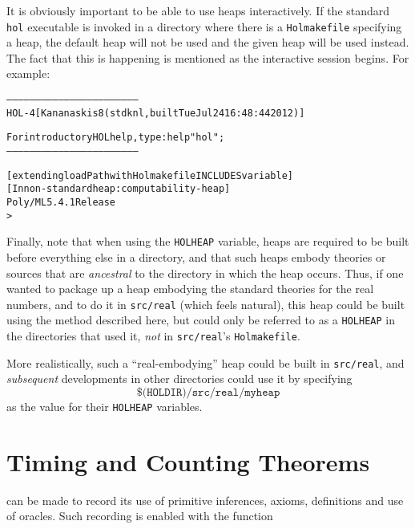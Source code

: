 It is obviously important to be able to use heaps interactively.
If the standard \texttt{hol} executable is invoked in a directory where there is a \texttt{Holmakefile} specifying a heap, the default heap will not be used and the given heap will be used instead.
The fact that this is happening is mentioned as the interactive session begins.
For example:
\begin{samepage}
\begin{alltt}
---------------------------------------------------------------------
       HOL-4 [Kananaskis 8 (stdknl, built Tue Jul 24 16:48:44 2012)]

       For introductory HOL help, type: help "hol";
---------------------------------------------------------------------

[extending loadPath with Holmakefile INCLUDES variable]
[In non-standard heap: computability-heap]
Poly/ML 5.4.1 Release
>
\end{alltt}
\end{samepage}

Finally, note that when using the \texttt{HOLHEAP} variable, heaps are required to be built before everything else in a directory, and that such heaps embody theories or \ML{} sources that are \emph{ancestral} to the directory in which the heap occurs.
Thus, if one wanted to package up a heap embodying the standard theories for the real numbers, and to do it in \texttt{src/real} (which feels natural), this heap could be built using the method described here, but could only be referred to as a \texttt{HOLHEAP} in the directories that used it, \emph{not} in \texttt{src/real}'s \texttt{Holmakefile}.

More realistically, such a ``real-embodying'' heap could be built in \texttt{src/real}, and \emph{subsequent} developments in other directories could use it by specifying\[
  \texttt{\$(HOLDIR)/src/real/myheap}
\]
as the value for their \texttt{HOLHEAP} variables.

\section{Timing and Counting Theorems}



\HOL{} can be made to record its use of primitive
inferences, axioms, definitions and use of oracles.  Such recording is
enabled with the function

